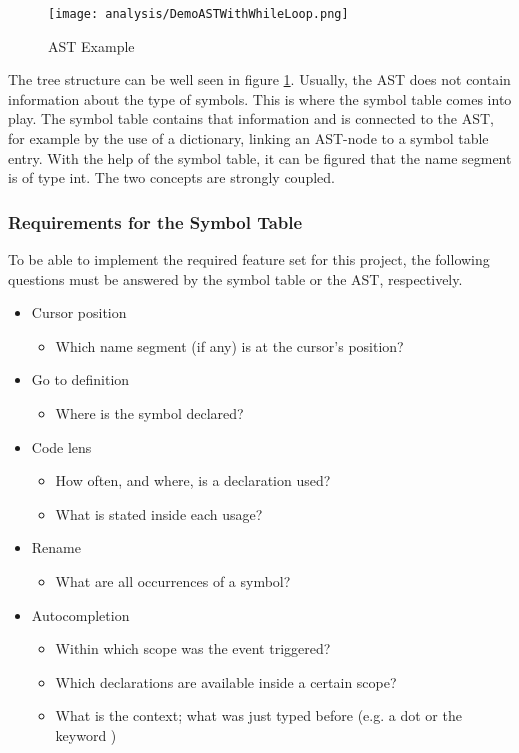 \begin{figure}[h]
    \centering
    \texttt{[image: analysis/DemoASTWithWhileLoop.png]}
    \caption{AST Example}
    \label{fig:ast_for_example}
\end{figure}

The tree structure can be well seen in figure \ref{fig:ast_for_example}.
Usually, the AST does not contain information about the type of symbols.
This is where the symbol table comes into play.
The symbol table contains that information and is connected to the AST, for example by the use of a dictionary, linking an AST-node to a symbol table entry.
With the help of the symbol table, it can be figured that the name segment  is of type int.
The two concepts are strongly coupled.

\subsubsection{Requirements for the Symbol Table}
To be able to implement the required feature set for this project, the following questions must be answered by the symbol table or the AST, respectively.
\begin{itemize}
    \item Cursor position
    \begin{itemize}
        \item Which name segment (if any) is at the cursor's position?
    \end{itemize}

    \item Go to definition
        \begin{itemize}
            \item Where is the symbol declared?
        \end{itemize}

    \item Code lens
        \begin{itemize}
            \item How often, and where, is a declaration used?
            \item What is stated inside each usage?
        \end{itemize}

    \item Rename
        \begin{itemize}
            \item What are all occurrences of a symbol?
        \end{itemize}

    \item Autocompletion
        \begin{itemize}
            \item Within which scope was the event triggered?
            \item Which declarations are available inside a certain scope?
            \item What is the context; what was just typed before (e.g. a dot or the keyword )
        \end{itemize}
\end{itemize}

